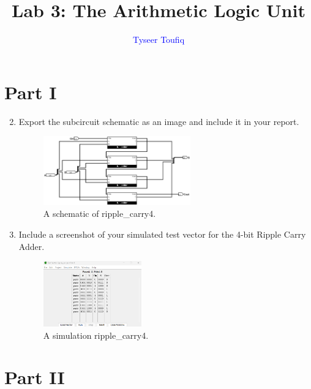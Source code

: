 \documentclass{article}
\title{Lab 3: The Arithmetic Logic Unit}
\author{\textcolor{blue}{Tyseer Toufiq}}
\begin{document}
\maketitle

\section*{Part I}

\begin{enumerate}
\setcounter{enumi}{1}
\item Export the subcircuit schematic as an image and include it in your report.

\begin{figure}[ht!]
    \centering
    \includegraphics[width=0.6\textwidth]{lab3_part1.png}
    \caption{A schematic of ripple\_carry4.}
    \label{f:part1}
\end{figure}

\item Include a screenshot of your simulated test vector for the 4-bit Ripple Carry Adder.

\begin{figure}[ht!]
    \centering
    \includegraphics[width=0.4\textwidth]{lab3_part1_simulation.png}
    \caption{A simulation ripple\_carry4.}
    \label{f:part1_simulation}
\end{figure}
\end{enumerate}

\section*{Part II}
\end{document}
